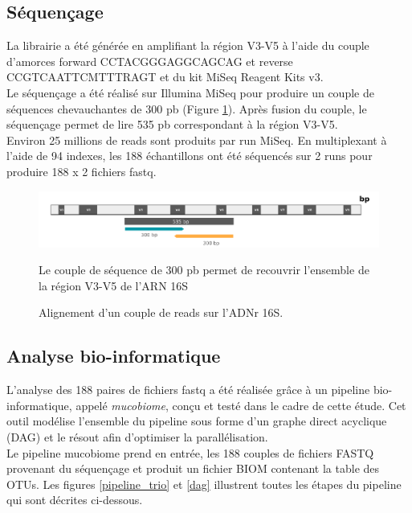 \documentclass[12pt,a4paper]{article}
\begin{document}
\subsection{Séquençage}
La librairie a été générée en amplifiant la région V3-V5 à l’aide du couple d’amorces forward CCTACGGGAGGCAGCAG et reverse CCGTCAATTCMTTTRAGT et du kit MiSeq Reagent Kits v3. \\
Le séquençage a été réalisé sur Illumina MiSeq pour produire un couple de séquences chevauchantes de 300 pb (Figure \ref{illumina}). Après fusion du couple, le séquençage permet de lire  535 pb correspondant à la région V3-V5.\\
Environ 25 millions de reads sont produits par run MiSeq. En multiplexant à l’aide de 94 indexes, les 188 échantillons ont été séquencés sur 2 runs pour produire 188 x 2 fichiers fastq.

\begin{figure}[ht]
\begin{center}
\includegraphics[scale=0.6]{img/illumina.png}\hfill
\end{center}
\caption{Alignement d'un couple de reads sur l'ADNr 16S.}
Le couple de séquence de 300 pb permet de recouvrir l'ensemble de la région V3-V5 de l'ARN 16S
\label{illumina}
\end{figure}


\subsection{Analyse bio-informatique}
L’analyse des 188 paires de fichiers fastq a été réalisée grâce à un pipeline bio-informatique, appelé \textit{mucobiome}, conçu et testé dans le cadre de cette étude. Cet outil modélise l'ensemble du pipeline sous forme d'un graphe direct acyclique (DAG) et le résout afin d'optimiser la parallélisation. \\
Le pipeline mucobiome prend en entrée, les 188 couples de fichiers FASTQ provenant du séquençage et produit un fichier BIOM contenant la table des OTUs. Les figures \ref{pipeline_trio} et \ref{dag} illustrent toutes les étapes du pipeline qui sont décrites ci-dessous.
\end{document}
